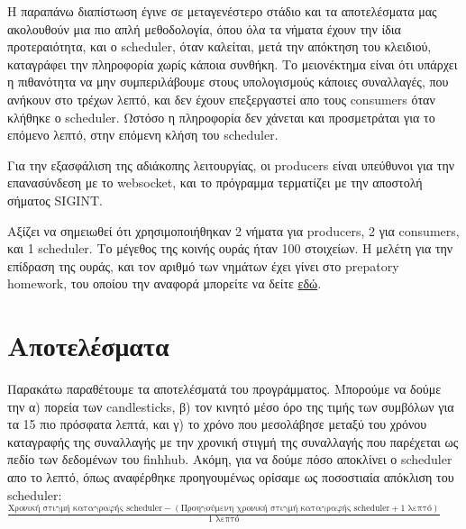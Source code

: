 \documentclass[12pt, a4paper]{article}
\begin{document}
Η παραπάνω διαπίστωση έγινε σε μεταγενέστερο στάδιο και τα αποτελέσματα μας ακολουθούν μια πιο απλή μεθοδολογία, όπου όλα τα νήματα έχουν την ίδια προτεραιότητα, και ο scheduler, όταν καλείται, μετά την απόκτηση του κλειδιού, καταγράφει την πληροφορία χωρίς κάποια συνθήκη. Το μειονέκτημα είναι ότι υπάρχει η πιθανότητα να μην συμπεριλάβουμε στους υπολογισμούς κάποιες συναλλαγές, που ανήκουν στο τρέχων λεπτό, και δεν έχουν επεξεργαστεί απο τους consumers όταν κλήθηκε ο scheduler. Ωστόσο η πληροφορία δεν χάνεται και προσμετράται για το επόμενο λεπτό, στην επόμενη κλήση του scheduler.

Για την εξασφάλιση της αδιάκοπης λειτουργίας, οι producers είναι υπεύθυνοι για την επανασύνδεση με το websocket, και το πρόγραμμα τερματίζει με την αποστολή σήματος SIGINT.

Αξίζει να σημειωθεί ότι χρησιμοποιήθηκαν 2 νήματα για producers, 2 για consumers, και 1 scheduler. Το μέγεθος της κοινής ουράς ήταν 100 στοιχείων. Η μελέτη για την επίδραση της ουράς, και τον αριθμό των νημάτων έχει γίνει στο prepatory homework, του οποίου την αναφορά μπορείτε να δείτε \href{https://github.com/thodkatz/embedded-rtos/blob/master/producer_consumer/report.pdf}{εδώ}.


\section{Αποτελέσματα}

Παρακάτω παραθέτουμε τα αποτελέσματά του προγράμματος. Μπορούμε να δούμε την α) πορεία των candlesticks, β) τον κινητό μέσο όρο της τιμής των συμβόλων για τα 15 πιο πρόσφατα λεπτά, και γ) το χρόνο που μεσολάβησε μεταξύ του χρόνου καταγραφής της συναλλαγής με την χρονική στιγμή της συναλλαγής που παρέχεται ως πεδίο των δεδομένων του finhhub. Ακόμη, για να δούμε πόσο αποκλίνει ο scheduler απο το λεπτό, όπως αναφέρθηκε προηγουμένως ορίσαμε ως ποσοστιαία απόκλιση του scheduler:
$\frac{\text{Χρονική στιγμή καταγραφής scheduler} - (\text{Προηγούμενη χρονική στιγμή καταγραφής scheduler} + 1 \text{ λεπτό})}{1 \text{ λεπτό}}$
\end{document}
